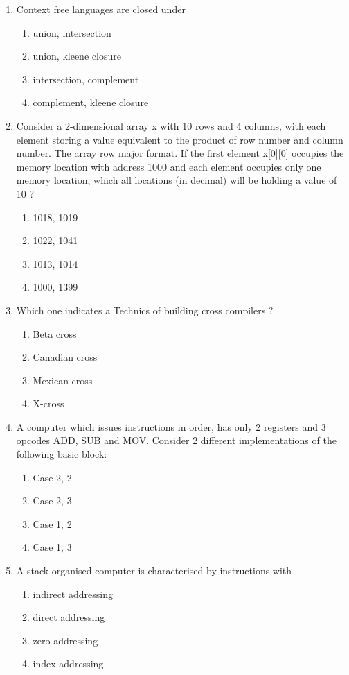 \documentclass[12pt]{article}
\begin{document}
\begin{enumerate}
\item[21.] Context free languages are closed under
\begin{enumerate}[label=\Alph*.]
  \item union, intersection
  \item union, kleene closure
  \item intersection, complement
  \item complement, kleene closure
\end{enumerate}

\item[22.] Consider a 2-dimensional array x with 10 rows and 4 columns, with each element storing a value equivalent to the product of row number and column number. The array row major format. If the first element x[0][0] occupies the memory location with address 1000 and each element occupies only one memory location, which all locations (in decimal) will be holding a value of 10 ?
\begin{enumerate}[label=\Alph*.]
  \item 1018, 1019
  \item 1022, 1041
  \item 1013, 1014
  \item 1000, 1399
\end{enumerate}

\item[23.] Which one indicates a Technics of building cross compilers ?
\begin{enumerate}[label=\Alph*.]
  \item Beta cross
  \item Canadian cross
  \item Mexican cross
  \item X-cross
\end{enumerate}

\item[24.] A computer which issues instructions in order, has only 2 registers and 3 opcodes ADD, SUB and MOV. Consider 2 different implementations of the following basic block:
\begin{enumerate}[label=\Alph*.]
  \item Case 2, 2
  \item Case 2, 3
  \item Case 1, 2
  \item Case 1, 3
\end{enumerate}

\item[25.] A stack organised computer is characterised by instructions with
\begin{enumerate}[label=\Alph*.]
  \item indirect addressing
  \item direct addressing
  \item zero addressing
  \item index addressing
\end{enumerate}


\end{enumerate}
\end{document}
